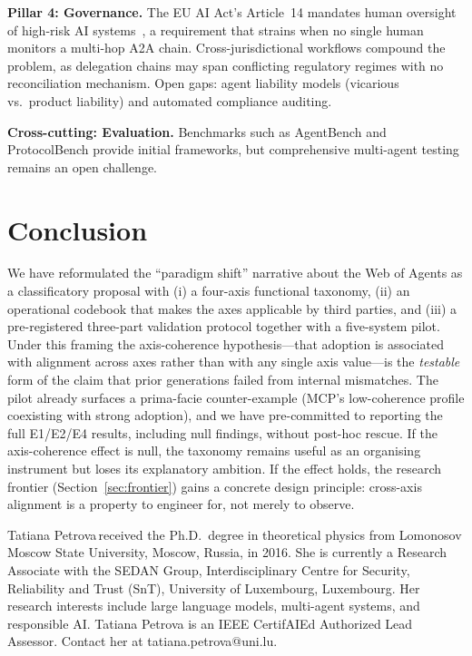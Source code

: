 \documentclass{IEEEcsmag}
\begin{document}
\textbf{Pillar 4: Governance.}  The EU AI Act's Article~14 mandates human oversight of high-risk AI systems~\cite{EUAI_2024}, a requirement that strains when no single human monitors a multi-hop A2A chain.  Cross-jurisdictional workflows compound the problem, as delegation chains may span conflicting regulatory regimes with no reconciliation mechanism.  Open gaps: agent liability models (vicarious vs.\ product liability) and automated compliance auditing.

\textbf{Cross-cutting: Evaluation.}  Benchmarks such as AgentBench and ProtocolBench provide initial frameworks, but comprehensive multi-agent testing remains an open challenge.


\section{Conclusion}\label{sec:conclusion}

We have reformulated the ``paradigm shift'' narrative about the Web of Agents as a classificatory proposal with (i) a four-axis functional taxonomy, (ii) an operational codebook that makes the axes applicable by third parties, and (iii) a pre-registered three-part validation protocol together with a five-system pilot.  Under this framing the axis-coherence hypothesis---that adoption is associated with alignment across axes rather than with any single axis value---is the \emph{testable} form of the claim that prior generations failed from internal mismatches.  The pilot already surfaces a prima-facie counter-example (MCP's low-coherence profile coexisting with strong adoption), and we have pre-committed to reporting the full E1/E2/E4 results, including null findings, without post-hoc rescue.  If the axis-coherence effect is null, the taxonomy remains useful as an organising instrument but loses its explanatory ambition.  If the effect holds, the research frontier (Section~\ref{sec:frontier}) gains a concrete design principle: cross-axis alignment is a property to engineer for, not merely to observe.






\begin{IEEEbiography}{Tatiana Petrova}{\,}received the Ph.D.\ degree
in theoretical physics from Lomonosov Moscow State University, Moscow,
Russia, in 2016. She is currently a Research Associate with the SEDAN
Group, Interdisciplinary Centre for Security, Reliability and Trust
(SnT), University of Luxembourg, Luxembourg. Her research interests
include large language models, multi-agent systems, and responsible AI.
Tatiana Petrova is an IEEE CertifAIEd Authorized Lead Assessor. Contact her
at tatiana.petrova@uni.lu.
\end{IEEEbiography}
\end{document}
